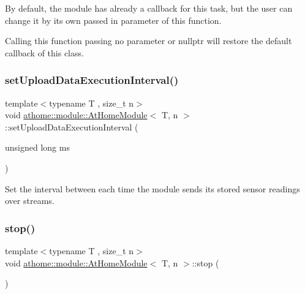 By default, the module has already a callback for this task, but the user can change it by its own passed in parameter of this function.

Calling this function passing no parameter or nullptr will restore the default callback of this class. \mbox{\label{classathome_1_1module_1_1_at_home_module_aa02b94ab5009d59d337144db364053a6}} 
\subsubsection{\texorpdfstring{set\+Upload\+Data\+Execution\+Interval()}{setUploadDataExecutionInterval()}}
{\footnotesize\ttfamily template$<$typename T , size\+\_\+t n$>$ \\
void \mbox{\hyperlink{classathome_1_1module_1_1_at_home_module}{athome\+::module\+::\+At\+Home\+Module}}$<$ T, n $>$\+::set\+Upload\+Data\+Execution\+Interval (\begin{DoxyParamCaption}\item[{unsigned long}]{ms }\end{DoxyParamCaption})\hspace{0.3cm}{\ttfamily [inline]}}

Set the interval between each time the module sends its stored sensor readings over streams. \mbox{\label{classathome_1_1module_1_1_at_home_module_a5589c1eb7edd2ab45d0a3de7bb475bbe}} 
\subsubsection{\texorpdfstring{stop()}{stop()}}
{\footnotesize\ttfamily template$<$typename T , size\+\_\+t n$>$ \\
void \mbox{\hyperlink{classathome_1_1module_1_1_at_home_module}{athome\+::module\+::\+At\+Home\+Module}}$<$ T, n $>$\+::stop (\begin{DoxyParamCaption}{ }\end{DoxyParamCaption})\hspace{0.3cm}{\ttfamily [inline]}}


